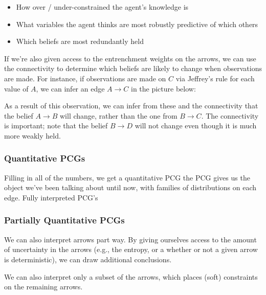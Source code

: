 \documentclass{article}
\begin{document}
	\begin{itemize}[nosep]
		\item How over / under-constrained the agent's knowledge is
		\item What variables the agent thinks are most robustly predictive of which others
		\item Which beliefs are most redundantly held
	\end{itemize} 
	If we're also given access to the entrenchment weights on the arrows, we can use the connectivity to determine which beliefs are likely to change when observations are made. For instance, if observations are made on $C$ via Jeffrey's rule for each value of $A$, we can infer an edge $A \to C$ in the picture below:
	\begin{center}
	\end{center}
	As a result of this observation, we can infer from these and the connectivity that the belief $A \to B$ will change, rather than the one from $B \to C$. The connectivity is important; note that the belief $B \to D$ will not change even though it is much more weakly held.

	
	\subsubsection{Quantitative PCGs}
	Filling in all of the numbers, we get a quantitative PCG the PCG gives us the object we've been talking about until now, with families of distributions on each edge. Fully interpreted PCG's 
	
	\subsubsection{Partially Quantitative PCGs}
	We can also interpret arrows part way. By giving ourselves access to the amount of uncertainty in the arrows (e.g., the entropy, or a whether or not a given arrow is deterministic), we can draw additional conclusions.
	
	
	We can also interpret only a subset of the arrows, which places (soft) constraints on the remaining arrows. 
	
\end{document}
